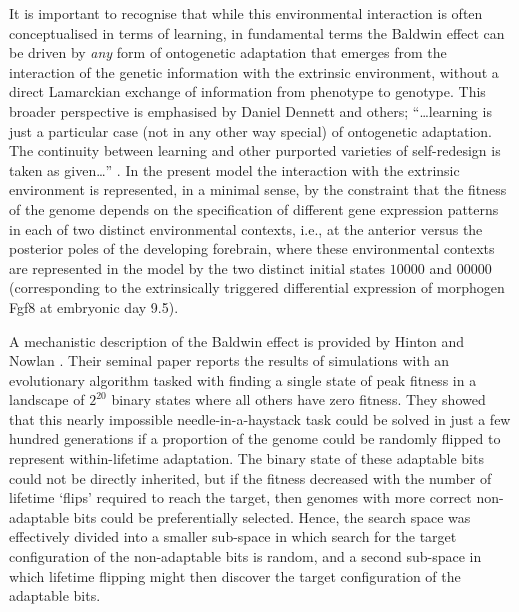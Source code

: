 \documentclass[10pt,letterpaper]{article}
\begin{document}


It is important to recognise that while this environmental interaction is often conceptualised in terms of learning, in fundamental terms the Baldwin effect can be driven by \emph{any} form of ontogenetic adaptation that emerges from the interaction of the genetic information with the extrinsic environment, without a direct Lamarckian exchange of information from phenotype to genotype. This broader perspective is emphasised by Daniel Dennett and others; ``\ldots learning is just a particular case (not in any other way special) of ontogenetic adaptation. The continuity between learning and other purported varieties of self-redesign is taken as given\ldots'' \cite{Dennett2003}. In the present model the interaction with the extrinsic environment is represented, in a minimal sense, by the constraint that the fitness of the genome depends on the specification of different gene expression patterns in each of two distinct environmental contexts, i.e., at the anterior versus the posterior poles of the developing forebrain, where these environmental contexts are represented in the model by the two distinct initial states $10000$ and $00000$ (corresponding to the extrinsically triggered differential expression of morphogen Fgf8 at embryonic day 9.5).

A mechanistic description of the Baldwin effect is provided by Hinton and Nowlan \cite{Hinton1987}. Their seminal paper reports the results of simulations with an evolutionary algorithm tasked with finding a single state of peak fitness in a landscape of $2^{20}$ binary states where all others have zero fitness. They showed that this nearly impossible needle-in-a-haystack task could be solved in just a few hundred generations if a proportion of the genome could be randomly flipped to represent within-lifetime adaptation. The binary state of these adaptable bits could not be directly inherited, but if the fitness decreased with the number of lifetime `flips' required to reach the target, then genomes with more correct non-adaptable bits could be preferentially selected. Hence, the search space was effectively divided into a smaller sub-space in which search for the target configuration of the non-adaptable bits is random, and a second sub-space in which lifetime flipping might then discover the target configuration of the adaptable bits. 
\end{document}
